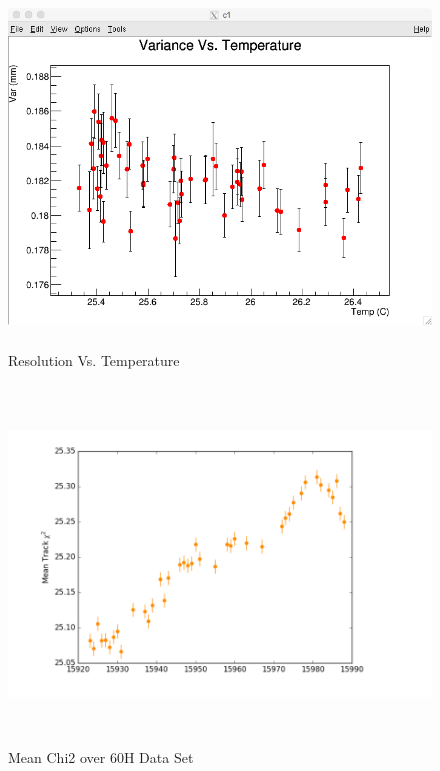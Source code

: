 \documentclass[./Thesis]{subfiles}
\begin{document}
\begin{figure}
	\centerline{\includegraphics[height=95mm]{VarianceVsTempIN.png}}
	\caption[Resolution Vs. Temperature]{Resolution Vs. Temperature}
	\label{fig:ResRun}
\end{figure} 

\begin{figure}
	\centerline{\includegraphics[height=95mm]{MeanChi260HDataSet.png}}
	\caption[Mean Chi2 over 60H Data Set]{ Mean Chi2 over 60H Data Set \cite{mLanc}}
	\label{fig:ChiRun}
\end{figure} 
\end{document}
